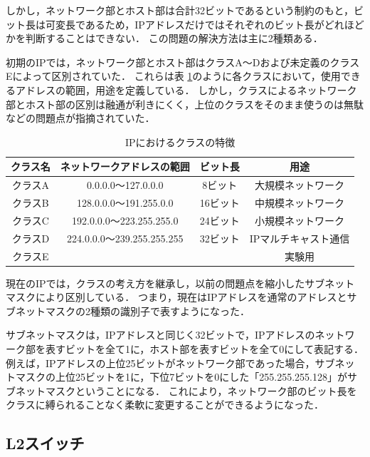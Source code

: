 しかし，ネットワーク部とホスト部は合計32ビットであるという制約のもと，ビット長は可変長であるため，IPアドレスだけではそれぞれのビット長がどれほどかを判断することはできない．
この問題の解決方法は主に2種類ある．

初期のIPでは，ネットワーク部とホスト部はクラスA～Dおよび未定義のクラスEによって区別されていた．
これらは表 \ref{tab:2-3}のように各クラスにおいて，使用できるアドレスの範囲，用途を定義している．
しかし，クラスによるネットワーク部とホスト部の区別は融通が利きにくく，上位のクラスをそのまま使うのは無駄などの問題点が指摘されていた．

\begin{table}[tb]
	\begin{center}
		\caption{IPにおけるクラスの特徴}
		\begin{tabular}{c|c|c|c}
			\hline \hline
			クラス名 & ネットワークアドレスの範囲 & ビット長 & 用途　\\ \hline
			クラスA & 0.0.0.0～127.0.0.0 & 8ビット & 大規模ネットワーク\\
			クラスB & 128.0.0.0～191.255.0.0 & 16ビット & 中規模ネットワーク \\
			クラスC & 192.0.0.0～223.255.255.0 & 24ビット & 小規模ネットワーク \\
			クラスD & 224.0.0.0～239.255.255.255 & 32ビット & IPマルチキャスト通信\\
			クラスE & & & 実験用　\\ \hline
		\end{tabular}
		\label{tab:2-3}
	\end{center}
\end{table}

現在のIPでは，クラスの考え方を継承し，以前の問題点を縮小したサブネットマスクにより区別している．
つまり，現在はIPアドレスを通常のアドレスとサブネットマスクの2種類の識別子で表すようになった．

サブネットマスクは，IPアドレスと同じく32ビットで，IPアドレスのネットワーク部を表すビットを全て1に，ホスト部を表すビットを全て0にして表記する．
例えば，IPアドレスの上位25ビットがネットワーク部であった場合，サブネットマスクの上位25ビットを1に，下位7ビットを0にした「255.255.255.128」がサブネットマスクということになる．
これにより，ネットワーク部のビット長をクラスに縛られることなく柔軟に変更することができるようになった．

\subsection{L2スイッチ}

